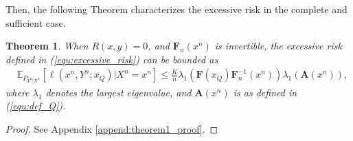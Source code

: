 \documentclass{article} %
\theoremstyle{plain} %
\newtheorem{theorem}{Theorem}[section]      %
\begin{document}
Then, the following Theorem characterizes the excessive risk in the complete and sufficient case.
\begin{theorem}\label{thm:compelete_sufficient}
When $R(x,y)=0$, and $\mathbf{F}_n(x^n)$ is invertible, the excessive risk defined in (\ref{equ:excessive_risk}) can be bounded as
\begin{align}\label{equ:complete_sufficient_ub}
&\mathbb{E}_{P_{Y^n|X^n}}\left[ 
\ell \left(x^n,Y^n;x_Q\right) | X^n = x^n\right]\leq \frac{K}{n}\lambda_1 \left(\mathbf{F}(x_Q)\mathbf{F}_n^{-1}(x^n) \right) \lambda_1(\textbf{A}(x^n)),
\end{align}
where $\lambda_1$ denotes the largest eigenvalue, and $\textbf{A}(x^n)$ is as defined in 
(\ref{equ:def_Q}).
\end{theorem}
\begin{proof}
    See Appendix \ref{append:theorem1_proof}.
\end{proof}
\end{document}
